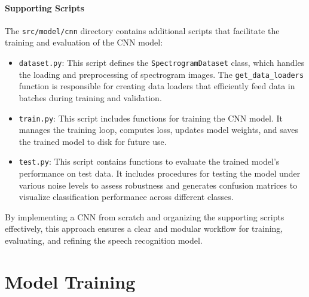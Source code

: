 \documentclass[12pt]{article}
\begin{document}
\paragraph{Supporting Scripts}

The \texttt{src/model/cnn} directory contains additional scripts that facilitate the training and evaluation of the CNN model:

\begin{itemize}
    \item \texttt{dataset.py}: This script defines the \texttt{SpectrogramDataset} class, which handles the loading and preprocessing of spectrogram images. The \texttt{get\_data\_loaders} function is responsible for creating data loaders that efficiently feed data in batches during training and validation.
    
    \item \texttt{train.py}: This script includes functions for training the CNN model. It manages the training loop, computes loss, updates model weights, and saves the trained model to disk for future use.
    
    \item \texttt{test.py}: This script contains functions to evaluate the trained model's performance on test data. It includes procedures for testing the model under various noise levels to assess robustness and generates confusion matrices to visualize classification performance across different classes.
\end{itemize}

By implementing a CNN from scratch and organizing the supporting scripts effectively, this approach ensures a clear and modular workflow for training, evaluating, and refining the speech recognition model.

\newpage




\section{Model Training}



\newpage


\end{document}
